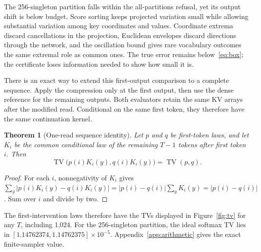 \documentclass[10pt]{article}
\newtheorem{theorem}{Theorem}
\theoremstyle{definition}\newtheorem{definition}[theorem]{Definition}
\newcommand{\TV}{\operatorname{TV}}
\begin{document}
The 256-singleton partition falls within the all-partitions refusal, yet its output shift is below budget. Score sorting keeps projected variation small while allowing substantial variation among key coordinates and values. Coordinate extrema discard cancellations in the projection, Euclidean envelopes discard directions through the network, and the oscillation bound gives rare vocabulary outcomes the same extremal role as common ones. The true error remains below~\eqref{eq:box}; the certificate loses information needed to show how small it is.

There is an exact way to extend this first-output comparison to a complete sequence. Apply the compression only at the first output, then use the dense reference for the remaining outputs. Both evaluators retain the same KV arrays after the modified read. Conditional on the same first token, they therefore have the same continuation kernel.

\begin{theorem}[One-read sequence identity]\label{thm:one}
Let $p$ and $q$ be first-token laws, and let $K_i$ be the common conditional law of the remaining $T-1$ tokens after first token $i$. Then
\[
 \TV\bigl(p(i)K_i(y),q(i)K_i(y)\bigr)=\TV(p,q).
\]
\end{theorem}
\begin{proof}
For each $i$, nonnegativity of $K_i$ gives
$\sum_y |p(i)K_i(y)-q(i)K_i(y)|=|p(i)-q(i)|\sum_y K_i(y)=|p(i)-q(i)|$.
Sum over $i$ and divide by two.
\end{proof}

The first-intervention laws therefore have the TVs displayed in Figure~\ref{fig:tv} for any $T$, including 1,024. For the 256-singleton partition, the ideal softmax TV lies in $[1.14762374,1.14762375]\times10^{-5}$. Appendix~\ref{app:arithmetic} gives the exact finite-sampler value.
\end{document}
